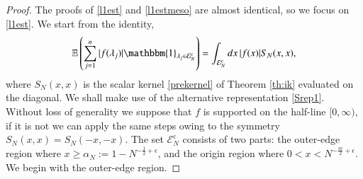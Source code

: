 \documentclass[11pt,reqno]{amsproc}
\numberwithin{equation}{section}
\numberwithin{theorem}{section}
\begin{document}
\begin{proof}
The proofs of \eqref{l1est} and \eqref{l1estmeso} are almost identical, so we focus on \eqref{l1est}. We start from the identity,
\begin{equation}
\mathbb{E}\left(\sum_{j=1}^{n}|f(\lambda_j)|\mathbbm{1}_{\lambda_{j} \in \mathcal{E}_{N}^{\mathrm{c}}}\right)  = \int_{\mathcal{E}_{N}^{\mathrm{c}}}dx\, |f(x)|S_{N}(x,x), \label{explinstat}
\end{equation}
where $S_{N}(x,x)$ is the scalar kernel \eqref{prekernel} of Theorem \ref{th:ik} evaluated on the diagonal. We shall make use of the alternative representation \eqref{Srep1}. Without loss of generality we suppose that $f$ is supported on the half-line $[0,\infty)$, if it is not we can apply the same steps owing to the symmetry $S_{N}(x,x) = S_{N}(-x,-x)$. The set $\mathcal{E}_{N}^{\mathrm{c}}$ consists of two parts: the outer-edge region where $x \geq \alpha_{N} := 1-N^{-\frac{1}{2}+\epsilon}$, and the origin region where $0 < x  < N^{-\frac{m}{2}+\epsilon}$. We begin with the outer-edge region. 


\end{proof}
\end{document}
